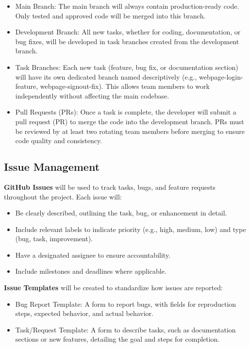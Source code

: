 \documentclass{article}
\begin{document}
\begin{itemize}
    \item Main Branch: The main branch will always contain production-ready code. Only tested and approved code will be merged into this branch.
    \item Development Branch: All new tasks, whether for coding, documentation, or bug fixes, will be developed in task branches created from the development branch.
    \item Task Branches: Each new task (feature, bug fix, or documentation section) will have its own dedicated branch named descriptively (e.g., webpage-login-feature, webpage-signout-fix). This allows team members to work independently without affecting the main codebase.
    \item Pull Requests (PRs): Once a task is complete, the developer will submit a pull request (PR) to merge the code into the development branch. PRs must be reviewed by at least two rotating team members before merging to ensure code quality and consistency.
\end{itemize}

\subsection{Issue Management}
\textbf{GitHub Issues} will be used to track tasks, bugs, and feature requests throughout the project. Each issue will:
\begin{itemize}
    \item Be clearly described, outlining the task, bug, or enhancement in detail.
    \item Include relevant labels to indicate priority (e.g., high, medium, low) and type (bug, task, improvement).
    \item Have a designated assignee to ensure accountability.
    \item Include milestones and deadlines where applicable.
\end{itemize}\par

\textbf{Issue Templates} will be created to standardize how issues are reported:
\begin{itemize}
    \item Bug Report Template: A form to report bugs, with fields for reproduction steps, expected behavior, and actual behavior.
    \item Task/Request Template: A form to describe tasks, such as documentation sections or new features, detailing the goal and steps for completion.
\end{itemize}
\end{document}
